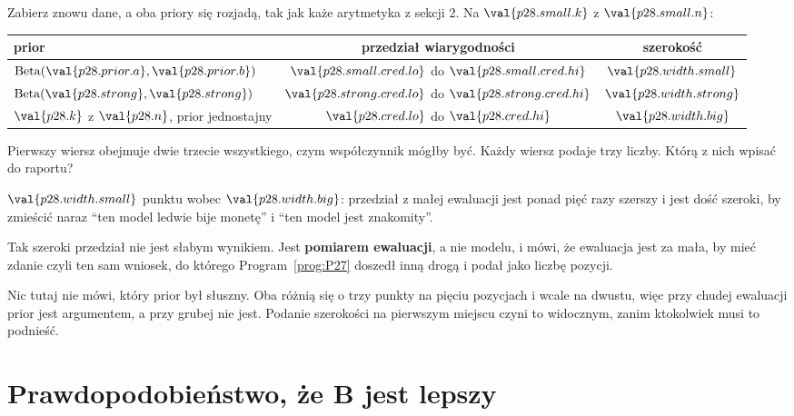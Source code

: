 \begin{fr}
Zabierz znowu dane, a oba priory się rozjadą, tak jak każe arytmetyka z
sekcji 2. Na $\val{p28.small.k}$ z $\val{p28.small.n}$:

\begin{center}
\begin{tabular}{lcc}
\toprule
prior & przedział wiarygodności & szerokość \\
\midrule
$\mathrm{Beta}(\val{p28.prior.a}, \val{p28.prior.b})$
  & $\val{p28.small.cred.lo}$ do $\val{p28.small.cred.hi}$
  & $\val{p28.width.small}$ \\
$\mathrm{Beta}(\val{p28.strong}, \val{p28.strong})$
  & $\val{p28.strong.cred.lo}$ do $\val{p28.strong.cred.hi}$
  & $\val{p28.width.strong}$ \\
\midrule
$\val{p28.k}$ z $\val{p28.n}$, prior jednostajny
  & $\val{p28.cred.lo}$ do $\val{p28.cred.hi}$
  & $\val{p28.width.big}$ \\
\bottomrule
\end{tabular}
\end{center}

Pierwszy wiersz obejmuje dwie trzecie wszystkiego, czym współczynnik mógłby
być. Każdy wiersz podaje trzy liczby. Którą z nich wpisać do raportu?
\dotline
\nextframe
\end{fr}

\begin{fr}

$\val{p28.width.small}$ punktu wobec $\val{p28.width.big}$: przedział z małej
ewaluacji jest ponad pięć razy szerszy i jest dość szeroki, by zmieścić
naraz \enquote{ten model ledwie bije monetę} i
\enquote{ten model jest znakomity}.

Tak szeroki przedział nie jest słabym wynikiem. Jest \textbf{pomiarem
ewaluacji}, a nie modelu, i mówi, że ewaluacja jest za mała, by mieć zdanie
\dash{} czyli ten sam wniosek, do którego Program~\ref{prog:P27} doszedł inną
drogą i podał jako liczbę pozycji.

\begin{note}
Nic tutaj nie mówi, który prior był słuszny. Oba różnią się o trzy punkty na
pięciu pozycjach i wcale na dwustu, więc przy chudej ewaluacji prior jest
argumentem, a przy grubej nie jest. Podanie szerokości na pierwszym miejscu
czyni to widocznym, zanim ktokolwiek musi to podnieść.
\end{note}
\end{fr}

\section{Prawdopodobieństwo, że B jest lepszy}
\label{sec:P28-better}

